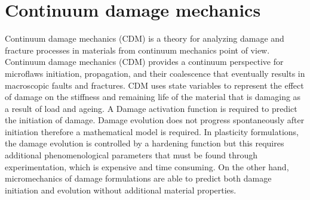\documentclass[a4paper,12pt]{article}
\begin{document}
\section{Continuum damage mechanics}
\indent\indent\indent Continuum damage mechanics (CDM) is a theory for analyzing damage and fracture processes in materials from continuum mechanics point of view. Continuum damage mechanics (CDM) provides a continuum perspective for microflaws initiation, propagation, and their coalescence that eventually results in macroscopic faults and fractures. CDM uses state variables to represent the effect of damage on the stiffness and remaining life of the material that is damaging as a result of load and ageing. A Damage activation function is required to predict the initiation of damage. Damage evolution does not progress spontaneously after initiation therefore a mathematical model is required.  In plasticity formulations, the damage evolution is controlled by a hardening function but this requires additional phenomenological parameters that must be found through experimentation, which is expensive and time consuming. On the other hand, micromechanics of damage formulations are able to predict both damage initiation and evolution without additional material properties.
\end{document}
